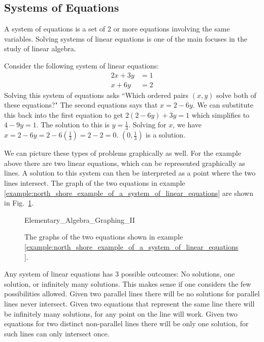 \documentclass[crop=false,class=book,oneside]{standalone}                      %
\begin{document}
    \subsection{Systems of Equations}
        A system of equations is a set of 2 or more equations involving the same variables. Solving systems of linear equations is one of the main focuses in the study of linear algebra.
        \begin{fexample}{}{}
        \label{example:north_shore_example_of_a_system_of_linear_equations}Consider the following system of linear equations:
        \begin{align*}
            2x+3y&=1\\
            x+6y&=2
        \end{align*}
        Solving this system of equations asks ``Which ordered pairs $(x,y)$ solve both of these equations?" The second equations says that $x=2-6y$. We can substitute this back into the first equation to get $2(2-6y)+3y=1$ which simplifies to $4-9y=1$. The solution to this is $y=\frac{1}{3}$. Solving for $x$, we have $x=2-6y=2-6(\frac{1}{3})=2-2=0$. $(0,\frac{1}{3})$ is a solution.
        \end{fexample}
        We can picture these types of problems graphically as well. For the example above there are two linear equations, which can be represented graphically as lines. A solution to this system can then be interpreted as a point where the two lines intersect. The graph of the two equations in example \ref{example:north_shore_example_of_a_system_of_linear_equations} are shown in Fig.~\ref{fig:north_shore_systems_of_linear_equations}.
        \begin{figure}[H]
            \centering
            \captionsetup{type=figure}
            {Elementary_Algebra_Graphing_II}
            \caption{The graphs of the two equations shown in example \ref{example:north_shore_example_of_a_system_of_linear_equations}.}
            \label{fig:north_shore_systems_of_linear_equations}
        \end{figure}
        Any system of linear equations has 3 possible outcomes: No solutions, one solution, or infinitely many solutions. This makes sense if one considers the few possibilities allowed. Given two parallel lines there will be no solutions for parallel lines never intersect. Given two equations that represent the same line there will be infinitely many solutions, for any point on the line will work. Given two equations for two distinct non-parallel lines there will be only one solution, for such lines can only intersect once.
\end{document}
